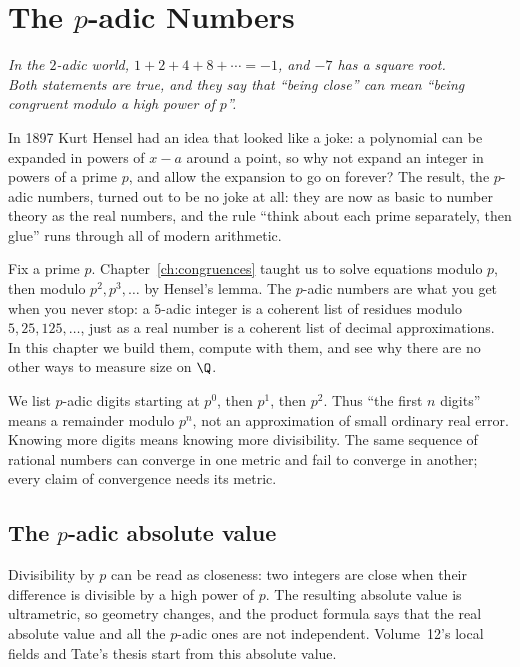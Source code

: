 \chapter{The \texorpdfstring{$p$}{p}-adic Numbers}\label{ch:padic}

\begin{center}\itshape
In the $2$-adic world, $1+2+4+8+\cdots=-1$, and $-7$ has a square root.\\
Both statements are true, and they say that ``being close'' can mean ``being congruent modulo a high power of $p$''.
\end{center}

In 1897 Kurt Hensel had an idea that looked like a joke: a polynomial can be expanded in powers of $x-a$ around a point, so why not expand an integer in
powers of a prime $p$, and allow the expansion to go on forever? The result, the $p$-adic numbers, turned out to be no joke at all: they are now as basic
to number theory as the real numbers, and the rule ``think about each prime separately, then glue'' runs through all of modern arithmetic.

Fix a prime $p$. Chapter~\ref{ch:congruences} taught us to solve equations modulo $p$, then modulo $p^2,p^3,\dots$ by Hensel's lemma. The $p$-adic numbers are what you get when you never stop: a $5$-adic integer is a coherent list of residues modulo $5,25,125,\dots$, just as a real number is a coherent list of decimal approximations. In this chapter we build them, compute with them, and see why there are no other ways to measure size on $\Q$.

\begin{reminder}
We list $p$-adic digits starting at $p^0$, then $p^1$, then $p^2$.
Thus ``the first $n$ digits'' means a remainder modulo $p^n$, not an
approximation of small ordinary real error. Knowing more digits means knowing
more divisibility. The same sequence of rational numbers can converge in one metric and
fail to converge in another; every claim of convergence needs its metric.
\end{reminder}

\section{The \texorpdfstring{$p$}{p}-adic absolute value}

Divisibility by $p$ can be read as closeness: two integers are close when their difference is divisible by a high power of $p$. The resulting absolute value is ultrametric, so geometry changes, and the product formula says that the real absolute value and all the $p$-adic ones are not independent. Volume~12's local fields and Tate's thesis start from this absolute value.

